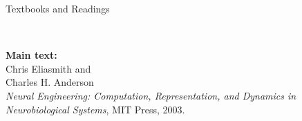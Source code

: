 \documentclass[aspectratio=169]{beamer}
\begin{document}
\begin{frame}{Textbooks and Readings}
	\begin{columns}[T]
			\raggedleft
			\fboxrule=0.4pt\fboxsep=0pt\\
			\small
			\textbf{Main text:}\\
			Chris Eliasmith and\\Charles H. Anderson\\
			\emph{Neural Engineering: Computation, Representation, and Dynamics in Neurobiological Systems}, MIT Press, 2003.
			\raggedleft

\end{columns}
\end{frame}
\end{document}
